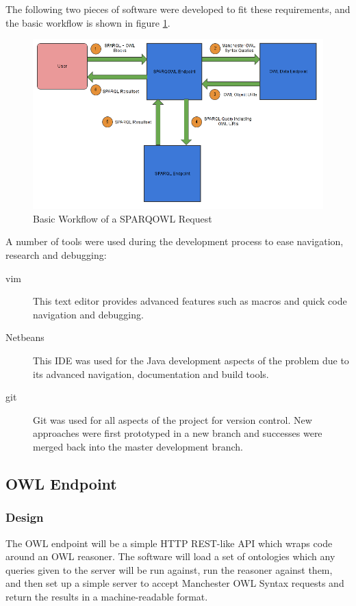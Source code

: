 \documentclass{article}
\begin{document}
The following two pieces of software were developed to fit these requirements,
and the basic workflow is shown in figure \ref{fig:sparqowl_request}.

\begin{figure}[h!]
  \centering
  \includegraphics[width=\textwidth]{sparqowl.png}
  \caption{Basic Workflow of a SPARQOWL Request}
  \label{fig:sparqowl_request}
\end{figure}

A number of tools were used during the development process to ease navigation,
research and debugging:

\begin{description}
    \item[vim] This text editor provides advanced features such as macros and
    quick code navigation and debugging.
    \item[Netbeans] This IDE was used for the Java development aspects of the
    problem due to its advanced navigation, documentation and build tools.
    \item[git] Git was used for all aspects of the project for version control.
    New approaches were first prototyped in a new branch and successes were
    merged back into the master development branch.
\end{description}

\subsection{OWL Endpoint}

\subsubsection{Design}

The OWL endpoint will be a simple HTTP REST-like API which wraps code around an
OWL reasoner. The software will load a set of ontologies which any queries given
to the server will be run against, run the reasoner against them, and then set
up a simple server to accept Manchester OWL Syntax requests and return the
results in a machine-readable format.
\end{document}
